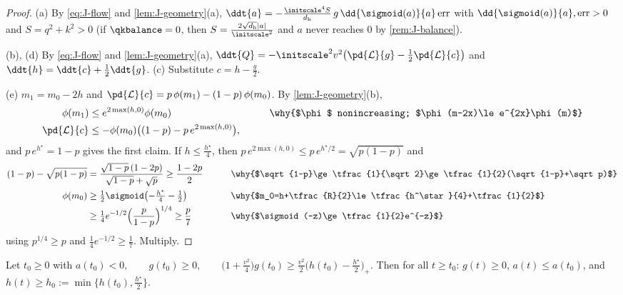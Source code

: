 \begin{proof}
(a) By \cref{eq:J-flow} and \cref{lem:J-geometry}(a), $\ddt{a}=-\frac{\initscale^4S}{d_{\mathrm h}}\,g\,\dd{\sigmoid(a)}{a}\,\mathrm{err}$ with $\dd{\sigmoid(a)}{a},\mathrm{err}>0$ and $S=q^2+k^2>0$ (if $\qkbalance=0$, then $S=\frac{2\sqrt{d_{\mathrm h}}|a|}{\initscale^2}$ and $a$ never reaches $0$ by \cref{rem:J-balance}).

(b), (d) By \cref{eq:J-flow} and \cref{lem:J-geometry}(a), $\ddt{Q}=-\initscale^2v^2\bigl(\pd{\mathcal L}{g}-\frac{1}{2}\pd{\mathcal L}{c}\bigr)$ and
$\ddt{h}=\ddt{c}+\frac{1}{2}\ddt{g}$. (c) Substitute $c=h-\frac{g}{2}$.

(e) $m_1=m_0-2h$ and $\pd{\mathcal L}{c}=p\,\phi(m_1)-(1-p)\,\phi(m_0)$. By \cref{lem:J-geometry}(b),
\begin{alignat*}{2}
 \phi(m_1)&\le e^{2\max(h,0)}\phi(m_0) &\qquad& \why{$\phi$ nonincreasing; $\phi(m-2x)\le e^{2x}\phi(m)$}\\
 \pd{\mathcal L}{c}&\le-\phi(m_0)\bigl((1-p)-p\,e^{2\max(h,0)}\bigr),
\end{alignat*}
and $p\,e^{h^\star}=1-p$ gives the first claim. If $h\le\frac{h^\star}{4}$, then $p\,e^{2\max(h,0)}\le p\,e^{h^\star/2}=\sqrt{p(1-p)}$ and
\begin{alignat*}{2}
 (1-p)-\sqrt{p(1-p)}&=\frac{\sqrt{1-p}\,(1-2p)}{\sqrt{1-p}+\sqrt p}\ge\frac{1-2p}{2} &\qquad& \why{$\sqrt{1-p}\ge\tfrac{1}{\sqrt2}\ge\tfrac{1}{2}(\sqrt{1-p}+\sqrt p)$}\\
 \phi(m_0)&\ge\tfrac{1}{2}\sigmoid\bigl(-\tfrac{h^\star}{4}-\tfrac{1}{2}\bigr) && \why{$m_0=h+\tfrac{R}{2}\le\tfrac{h^\star}{4}+\tfrac{1}{2}$}\\
 &\ge\tfrac{1}{4}e^{-1/2}\Bigl(\frac{p}{1-p}\Bigr)^{1/4}\ge\frac{p}{7} && \why{$\sigmoid(-z)\ge\tfrac{1}{2}e^{-z}$}
\end{alignat*}
using $p^{1/4}\ge p$ and $\frac{1}{4}e^{-1/2}\ge\frac{1}{7}$. Multiply.
\end{proof}

\begin{lemma}
\label{lem:J-align}
Let $t_0\ge0$ with
 $a(t_0)<0,\qquad g(t_0)\ge0,\qquad \bigl(1+\tfrac{v^2}{4}\bigr)g(t_0)\ge\tfrac{v^2}{2}\bigl(h(t_0)-\tfrac{h^\star}{2}\bigr)_+ .$ 
Then for all $t\ge t_0$: $g(t)\ge0$, $a(t)\le a(t_0)$, and $h(t)\ge h_0:=\min\{h(t_0),\frac{h^\star}{2}\}$.
\end{lemma}

